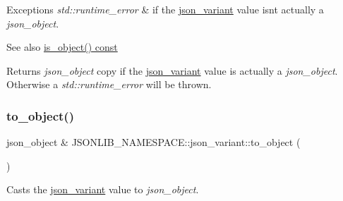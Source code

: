 \begin{DoxyExceptions}{Exceptions}
{\em std\+::runtime\+\_\+error} & if the \hyperlink{classJSONLIB__NAMESPACE_1_1json__variant}{json\+\_\+variant} value isn\textquotesingle{}t actually a {\itshape json\+\_\+object}. \\
\hline
\end{DoxyExceptions}
\begin{DoxySeeAlso}{See also}
\hyperlink{classJSONLIB__NAMESPACE_1_1json__variant_a28b4156626bd9f0e344ba1704c7590f3}{is\+\_\+object() const} 
\end{DoxySeeAlso}
\begin{DoxyReturn}{Returns}
{\itshape json\+\_\+object} copy if the \hyperlink{classJSONLIB__NAMESPACE_1_1json__variant}{json\+\_\+variant} value is actually a {\itshape json\+\_\+object}. Otherwise a {\itshape std\+::runtime\+\_\+error} will be thrown. 
\end{DoxyReturn}
\mbox{\label{classJSONLIB__NAMESPACE_1_1json__variant_a05536ef12c8da052e4716087651b43ad}} 
\subsubsection{\texorpdfstring{to\+\_\+object()}{to\_object()}\hspace{0.1cm}{\footnotesize\ttfamily [2/4]}}
{\footnotesize\ttfamily json\+\_\+object \& J\+S\+O\+N\+L\+I\+B\+\_\+\+N\+A\+M\+E\+S\+P\+A\+C\+E\+::json\+\_\+variant\+::to\+\_\+object (\begin{DoxyParamCaption}{ }\end{DoxyParamCaption})}



Casts the \hyperlink{classJSONLIB__NAMESPACE_1_1json__variant}{json\+\_\+variant} value to {\itshape json\+\_\+object}. 


